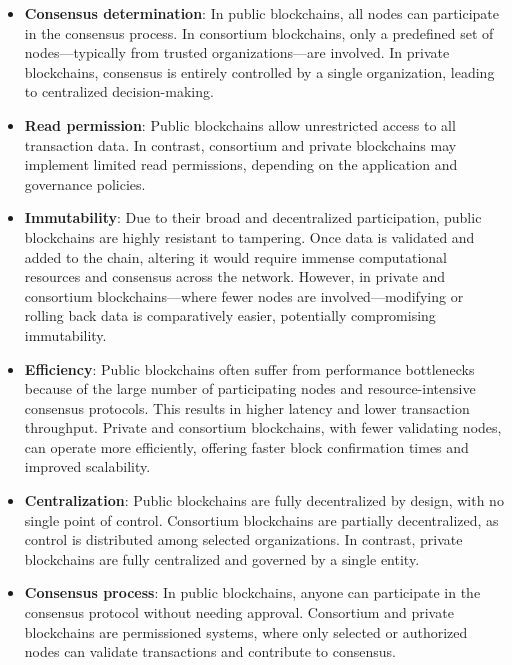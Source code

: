 \begin{itemize}
    \item \textbf{Consensus determination}: In public blockchains, all nodes can participate in the consensus process. In consortium blockchains, only a predefined set of nodes—typically from trusted organizations—are involved. In private blockchains, consensus is entirely controlled by a single organization, leading to centralized decision-making.

    \item \textbf{Read permission}: Public blockchains allow unrestricted access to all transaction data. In contrast, consortium and private blockchains may implement limited read permissions, depending on the application and governance policies.

    \item \textbf{Immutability}: Due to their broad and decentralized participation, public blockchains are highly resistant to tampering. Once data is validated and added to the chain, altering it would require immense computational resources and consensus across the network. However, in private and consortium blockchains—where fewer nodes are involved—modifying or rolling back data is comparatively easier, potentially compromising immutability.

    \item \textbf{Efficiency}: Public blockchains often suffer from performance bottlenecks because of the large number of participating nodes and resource-intensive consensus protocols. This results in higher latency and lower transaction throughput. Private and consortium blockchains, with fewer validating nodes, can operate more efficiently, offering faster block confirmation times and improved scalability.

    \item \textbf{Centralization}: Public blockchains are fully decentralized by design, with no single point of control. Consortium blockchains are partially decentralized, as control is distributed among selected organizations. In contrast, private blockchains are fully centralized and governed by a single entity.

    \item \textbf{Consensus process}: In public blockchains, anyone can participate in the consensus protocol without needing approval. Consortium and private blockchains are permissioned systems, where only selected or authorized nodes can validate transactions and contribute to consensus.
\end{itemize}

